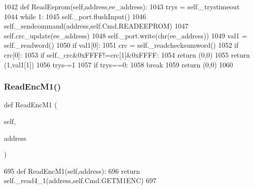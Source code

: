 \begin{DoxyCode}
1042     \textcolor{keyword}{def }ReadEeprom(self,address,ee\_address):
1043         trys = self.\_trystimeout
1044         \textcolor{keywordflow}{while} 1:
1045             self.\_port.flushInput()
1046             self.\_sendcommand(address,self.Cmd.READEEPROM)
1047             self.crc\_update(ee\_address)
1048             self.\_port.write(chr(ee\_address))
1049             val1 = self.\_readword()
1050             \textcolor{keywordflow}{if} val1[0]:
1051                 crc = self.\_readchecksumword()
1052                 \textcolor{keywordflow}{if} crc[0]:
1053                     \textcolor{keywordflow}{if} self.\_crc&0xFFFF!=crc[1]&0xFFFF:
1054                         \textcolor{keywordflow}{return} (0,0)
1055                     \textcolor{keywordflow}{return} (1,val1[1])
1056             trys-=1
1057             \textcolor{keywordflow}{if} trys==0:
1058                 \textcolor{keywordflow}{break}
1059         \textcolor{keywordflow}{return} (0,0)
1060 
\end{DoxyCode}
\mbox{\label{classtoxic__hardware_1_1roboclaw__3_1_1Roboclaw_a912ba280064ac04e9d69e7333da9c143}} 
\subsubsection{\texorpdfstring{Read\+Enc\+M1()}{ReadEncM1()}}
{\footnotesize\ttfamily def Read\+Enc\+M1 (\begin{DoxyParamCaption}\item[{}]{self,  }\item[{}]{address }\end{DoxyParamCaption})}


\begin{DoxyCode}
695     \textcolor{keyword}{def }ReadEncM1(self,address):
696         \textcolor{keywordflow}{return} self.\_read4\_1(address,self.Cmd.GETM1ENC)
697 
\end{DoxyCode}
\mbox{\label{classtoxic__hardware_1_1roboclaw__3_1_1Roboclaw_a070a811f611cd1b8c86c375eac24cd71}} 
